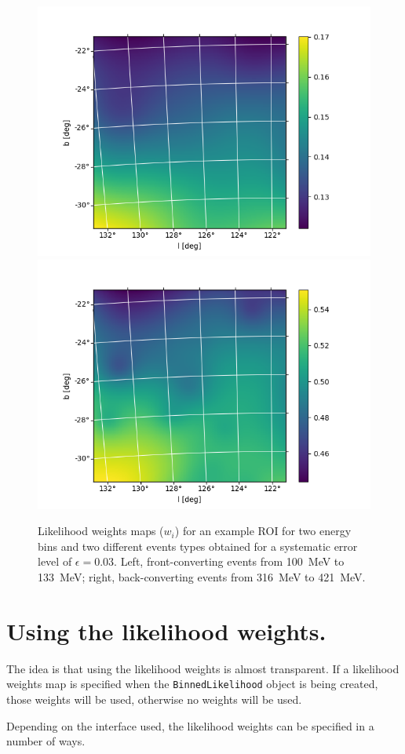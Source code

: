 \documentclass[preprint]{aastex}
\begin{document}
\begin{figure}[h]  
\begin{centering}
\includegraphics[width=0.49\columnwidth]{figures/wmap_E00_00.png}
\includegraphics[width=0.49\columnwidth]{figures/wmap_E01_04.png}
\vspace{-0.10in}
\caption{\label{fig:wmap}Likelihood weights maps ($w_{i}$) for an example ROI
  for two energy bins and two different events types obtained for
  a systematic error level of $\epsilon = 0.03$.  Left, front-converting events 
  from 100~MeV to 133~MeV; right, back-converting events from 316~MeV to 421~MeV.}
\end{centering}
\end{figure}



\section{Using the likelihood weights.}

The idea is that using the likelihood weights is almost transparent.
If a likelihood weights map is specified when the {\tt BinnedLikelihood}
object is being created, those weights will be used, otherwise no
weights will be used.

Depending on the interface used, the likelihood weights can be
specified in a number of ways.
\end{document}
